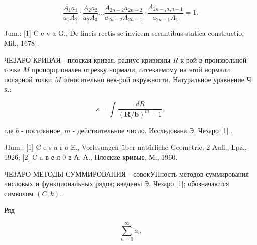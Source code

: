 \documentclass[10pt]{article}
\begin{document}
\[

\frac{A_{1} a_{1}}{a_{1} A_{2}} \cdot \frac{A_{2} a_{2}}{a_{2} A_{3}} \ldots \frac{A_{2 n-2} a_{2 n-2}}{a_{2 n-2} A_{2 n-1}} \cdot \frac{A_{2 n-{ }_{1} a_{2} n-1}}{a_{2 n-1} A_{1}}=1 .

\]



Jum.: [1] C e v a G., De lineis rectis se invicem secantibus statica constructio, Mil., 1678 .



ЧЕЗАРО КРИВАЯ - плоская кривая, радиус кривизны $R$ к-рой в произвольной точке $M$ пропорционален отрезку нормали, отсекаемому на этой нормали полярной точки $M$ относительно нек-рой окружности. Натуральное уравнение Ч. к.:



\[

s=\int \frac{d R}{(\boldsymbol{R} / \boldsymbol{b})^{m}-1},

\]



где $b$ - постоянное, $m$ - действительное число. Исследована Э. Чезаро [1] .



JIum.: [1] C e s a r o E., Vorlesungen über natürliche Geometrie, 2 Aufl., Lpz., 1926; [2] C a в е л 0 в А. А., Плоские кривые, М., 1960.



ЧЕЗАРО МЕТОДЫ СУММИРОВАНИЯ - совокУПность методов суммирования числовых и функциональных рядов; введены Э. Чезаро [1]; обозначаются символом $(C, k)$.



Ряд



\[

\sum_{n=0}^{\infty} a_{n}

\]
\end{document}
